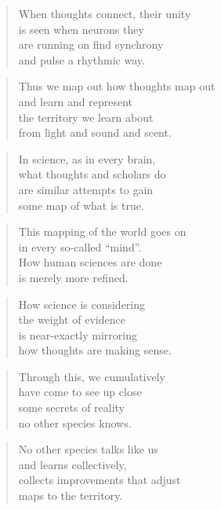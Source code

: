 \documentclass[10pt,a4paper]{article}
\begin{document}
\begin{multicols}{2}
\begin{verse}
When thoughts connect, their unity\\
is seen when neurons they\\
are running on find synchrony\\
and pulse a rhythmic way.
\end{verse}

\begin{verse}
Thus we map out how thoughts map out\\
and learn and represent\\
the territory we learn about\\
from light and sound and scent.
\end{verse}

\begin{verse}
In science, as in every brain,\\
what thoughts and scholars do\\
are similar attempts to gain\\
some map of what is true.
\end{verse}

\begin{verse}
This mapping of the world goes on\\
in every so-called “mind”.\\
How human sciences are done\\
is merely more refined.
\end{verse}

\begin{verse}
How science is considering\\
the weight of evidence\\
is near-exactly mirroring\\
how thoughts are making sense.
\end{verse}

\begin{verse}
Through this, we cumulatively\\
have come to see up close\\
some secrets of reality\\
no other species knows.
\end{verse}

\begin{verse}
No other species talks like us\\
and learns collectively,\\
collects improvements that adjust\\
maps to the territory.
\end{verse}


\end{multicols}
\end{document}
